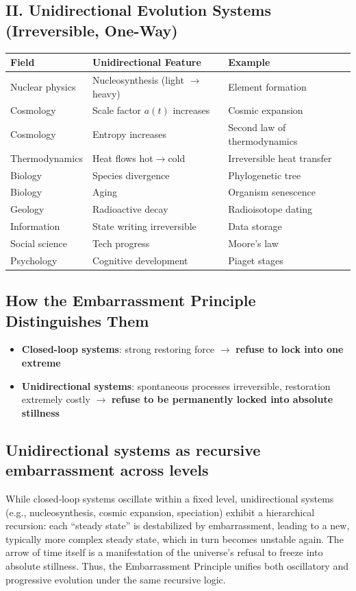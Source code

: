 \documentclass[10pt,a4paper]{article}
\begin{document}
\subsection{II. Unidirectional Evolution Systems (Irreversible, One-Way)}
\begin{center}
\small
\begin{tabular}{p{1.8cm}p{2.8cm}p{2.8cm}}
\toprule
Field & Unidirectional Feature & Example \\
\midrule
Nuclear physics & Nucleosynthesis (light $\to$ heavy) & Element formation \\
Cosmology & Scale factor $a(t)$ increases & Cosmic expansion \\
Cosmology & Entropy increases & Second law of thermodynamics \\
Thermodynamics & Heat flows hot$\to$cold & Irreversible heat transfer \\
Biology & Species divergence & Phylogenetic tree \\
Biology & Aging & Organism senescence \\
Geology & Radioactive decay & Radioisotope dating \\
Information & State writing irreversible & Data storage \\
Social science & Tech progress & Moore’s law \\
Psychology & Cognitive development & Piaget stages \\
\bottomrule
\end{tabular}
\end{center}

\subsection{How the Embarrassment Principle Distinguishes Them}
\begin{itemize}[noitemsep]
\item \textbf{Closed-loop systems}: strong restoring force $\to$ \textbf{refuse to lock into one extreme}
\item \textbf{Unidirectional systems}: spontaneous processes irreversible, restoration extremely costly $\to$ \textbf{refuse to be permanently locked into absolute stillness}
\end{itemize}

\subsection{Unidirectional systems as recursive embarrassment across levels}
While closed‑loop systems oscillate within a fixed level, unidirectional systems (e.g., nucleosynthesis, cosmic expansion, speciation) exhibit a hierarchical recursion: each “steady state” is destabilized by embarrassment, leading to a new, typically more complex steady state, which in turn becomes unstable again. The arrow of time itself is a manifestation of the universe’s refusal to freeze into absolute stillness. Thus, the Embarrassment Principle unifies both oscillatory and progressive evolution under the same recursive logic.
\end{document}
